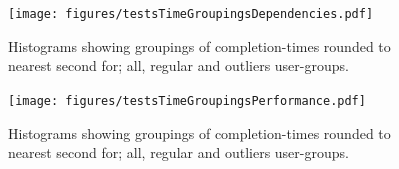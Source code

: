 \documentclass[nofilelist,dvipsnames]{cslthse-msc}
\begin{document}
        \begin{figure}[h!]
          \centering
          \texttt{[image: figures/testsTimeGroupingsDependencies.pdf]}
          \caption{
            Histograms showing groupings of completion-times rounded to nearest
            second for; all, regular and outliers user-groups.
          }
        \end{figure}

        \begin{figure}[h!]
          \centering
          \texttt{[image: figures/testsTimeGroupingsPerformance.pdf]}
          \caption{
            Histograms showing groupings of completion-times rounded to nearest
            second for; all, regular and outliers user-groups.
          }
        \end{figure}
\end{document}

